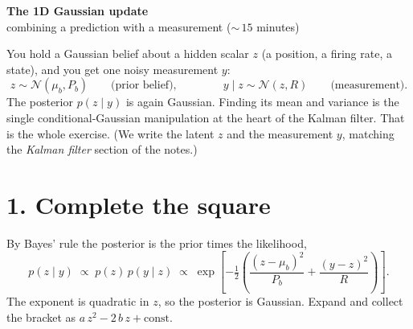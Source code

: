 \documentclass[11pt]{article}
\begin{document}
\begin{center}
{\Large \textbf{The 1D Gaussian update}}\\[0.2em]
{\small combining a prediction with a measurement (${\sim}\,15$ minutes)}
\end{center}

\vspace{0.5em}

You hold a Gaussian belief about a hidden scalar $z$ (a position, a firing rate,
a state), and you get one noisy measurement $y$:
\[
  z \sim \mathcal{N}(\mu_b, P_b)
  \qquad\text{(prior belief)},
  \qquad\qquad
  y \mid z \sim \mathcal{N}(z, R)
  \qquad\text{(measurement)} .
\]
The posterior $p(z\mid y)$ is again Gaussian. Finding its mean and variance is the
single conditional-Gaussian manipulation at the heart of the Kalman filter. That
is the whole exercise. (We write the latent $z$ and the measurement $y$, matching
the \emph{Kalman filter} section of the notes.)

\section*{1. Complete the square}

By Bayes' rule the posterior is the prior times the likelihood,
\[
  p(z\mid y) \;\propto\; p(z)\,p(y\mid z)
  \;\propto\;
  \exp\!\left[-\tfrac{1}{2}\left(
      \frac{(z-\mu_b)^2}{P_b} + \frac{(y-z)^2}{R}
  \right)\right] .
\]
The exponent is quadratic in $z$, so the posterior is Gaussian. Expand and collect
the bracket as $a\,z^2 - 2\,b\,z + \text{const}$.
\end{document}
